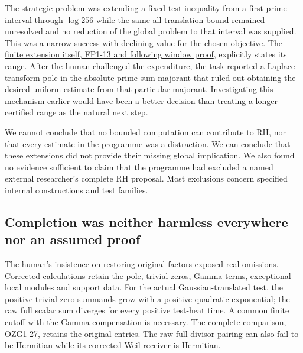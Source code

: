 \documentclass[
  british,
  11pt,
  a4paper,
]{article}
\begin{document}
The strategic problem was extending a fixed-test inequality from a
first-prime interval through \(\log256\) while the same all-translation
bound remained unresolved and no reduction of the global problem to that
interval was supplied. This was a narrow success with declining value
for the chosen objective. The
\href{https://github.com/KokunoYumeto/zeta-function-research-reader/blob/e1dc06aa68bb810cf7d8b0006942f5b036b8b765/workbenches/splitzero-tandem/branches/tau-zero-prime-positivity/FINITE_PRIME_WINDOW_EXTENSION.md}{finite
extension itself, FP1-13 and following window proof}, explicitly states
its range. After the human challenged the expenditure, the task reported
a Laplace-transform pole in the absolute prime-sum majorant that ruled
out obtaining the desired uniform estimate from that particular
majorant. Investigating this mechanism earlier would have been a better
decision than treating a longer certified range as the natural next
step.

We cannot conclude that no bounded computation can contribute to RH, nor
that every estimate in the programme was a distraction. We can conclude
that these extensions did not provide their missing global implication.
We also found no evidence sufficient to claim that the programme had
excluded a named external researcher's complete RH proposal. Most
exclusions concern specified internal constructions and test families.

\subsection{Completion was neither harmless everywhere nor an assumed
proof}\label{completion-was-neither-harmless-everywhere-nor-an-assumed-proof}

The human's insistence on restoring original factors exposed real
omissions. Corrected calculations retain the pole, trivial zeros, Gamma
terms, exceptional local modules and support data. For the actual
Gaussian-translated test, the positive trivial-zero summands grow with a
positive quadratic exponential; the raw full scalar sum diverges for
every positive test-heat time. A common finite cutoff with the Gamma
compensation is necessary. The
\href{https://github.com/KokunoYumeto/zeta-function-research-reader/blob/e1dc06aa68bb810cf7d8b0006942f5b036b8b765/workbenches/splitzero-tandem/branches/tau-zero-prime-positivity/ORIGINAL_ZETA_GAUSSIAN_TRANSLATION_RECONSTRUCTION.md}{complete
comparison, OZG1-27}, retains the original entries. The raw full-divisor
pairing can also fail to be Hermitian while its corrected Weil receiver
is Hermitian.
\end{document}
